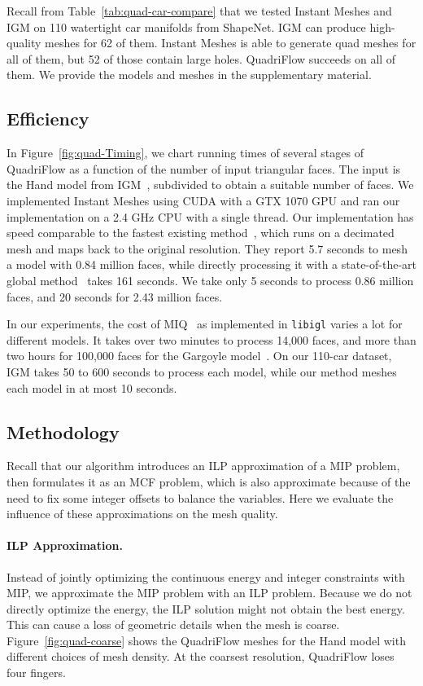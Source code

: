 Recall from Table~\ref{tab:quad-car-compare} that we tested Instant Meshes and IGM on 110 watertight car manifolds from ShapeNet. IGM can produce high-quality meshes for 62 of them. Instant Meshes is able to generate quad meshes for all of them, but 52 of those contain large holes. QuadriFlow succeeds on all of them. We provide the models and meshes in the supplementary material.

\subsection{Efficiency}

In Figure~\ref{fig:quad-Timing}, we chart running times of several stages of QuadriFlow as a function of the number of input triangular faces. The input is the Hand model from IGM~\cite{bommes2013integer}, subdivided to obtain a suitable number of faces. We implemented Instant Meshes using CUDA with a GTX 1070 GPU and ran our implementation on a 2.4 GHz CPU with a single thread. Our implementation has speed comparable to the fastest existing method~\cite{ebke2016interactively}, which runs on a decimated mesh and maps back to the original resolution. They report 5.7 seconds to mesh a model with 0.84 million faces, while directly processing it with a state-of-the-art global method~\cite{ebke2014level} takes 161 seconds. We take only 5 seconds to process 0.86 million faces, and 20 seconds for 2.43 million faces.

In our experiments, the cost of MIQ~\cite{bommes2009mixed} as implemented in \texttt{libigl} varies a lot for different models. It takes over two minutes to process 14,000 faces, and more than two hours for 100,000 faces for the Gargoyle model~\cite{tarini2010practical}. On our 110-car dataset, IGM takes 50 to 600 seconds to process each model, while our method meshes each model in at most 10 seconds.

\subsection{Methodology}
\label{sec:quad-methodology}

Recall that our algorithm introduces an ILP approximation of a MIP problem, then formulates it as an MCF problem, which is also approximate because of the need to fix some integer offsets to balance the variables. Here we evaluate the influence of these approximations on the mesh quality.

\paragraph*{ILP Approximation.} Instead of jointly optimizing the continuous energy and integer constraints with MIP, we approximate the MIP problem with an ILP problem. Because we do not directly optimize the energy, the ILP solution might not obtain the best energy. This can cause a loss of geometric details when the mesh is coarse. Figure~\ref{fig:quad-coarse} shows the QuadriFlow meshes for the Hand model with different choices of mesh density. At the coarsest resolution, QuadriFlow loses four fingers.

